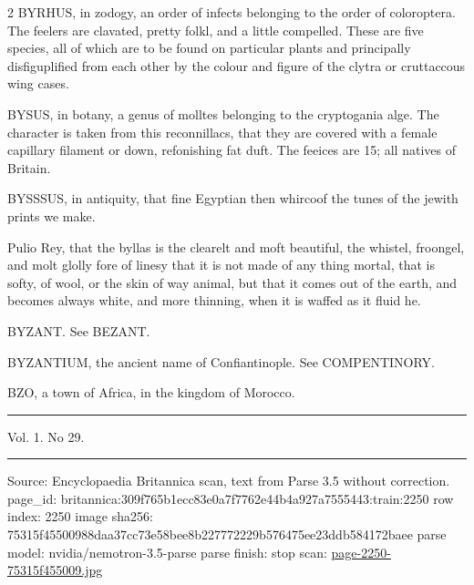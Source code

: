 \documentclass[10pt]{article}
\begin{document}
\begin{multicols}{2}
BYRHUS, in zodogy, an order of infects belonging to the order of coloroptera. The feelers are clavated, pretty folkl, and a little compelled. These are five species, all of which are to be found on particular plants and principally disfiguplified from each other by the colour and figure of the clytra or cruttaccous wing cases.

BYSUS, in botany, a genus of molltes belonging to the cryptogania alge. The character is taken from this reconnillacs, that they are covered with a female capillary filament or down, refonishing fat duft. The feeices are 15; all natives of Britain.

BYSSSUS, in antiquity, that fine Egyptian then whircoof the tunes of the jewith prints we make.

Pulio Rey, that the byllas is the clearelt and moft beautiful, the whistel, froongel, and molt glolly fore of linesy that it is not made of any thing mortal, that is softy, of wool, or the skin of way animal, but that it comes out of the earth, and becomes always white, and more thinning, when it is waffed as it fluid he.

BYZANT. See BEZANT.

BYZANTIUM, the ancient name of Confiantinople. See COMPENTINORY.

BZO, a town of Africa, in the kingdom of Morocco.

\end{multicols}
\par\vspace{4pt}\noindent\rule{0.3\linewidth}{0.4pt}\par
{\footnotesize
Vol. 1. No 29.\par}
\vfill\par\noindent\rule{\linewidth}{0.4pt}\par
{\scriptsize\color{gray}\noindent Source: Encyclopaedia Britannica scan, text from Parse 3.5 without correction. page\_id: britannica:309f765b1ecc83e0a7f7762e44b4a927a7555443:train:2250 \quad row index: 2250 \quad image sha256: 75315f45500988daa37cc73e58bee8b227772229b576475ee23ddb584172baee \quad parse model: nvidia/nemotron-3.5-parse \quad parse finish: stop \quad scan: \href{../scans/page-2250-75315f455009.jpg}{page-2250-75315f455009.jpg}\par}
\end{document}
